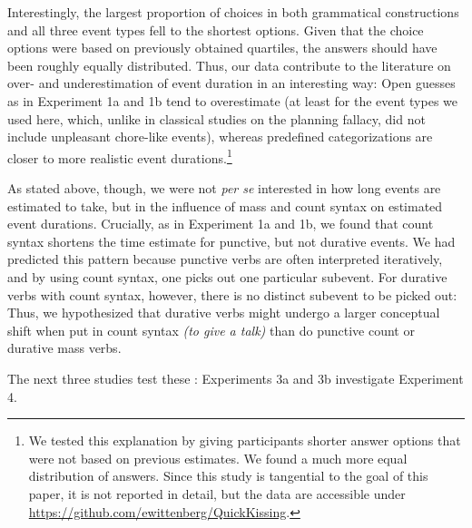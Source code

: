\documentclass[review,12pt,authoryear]{elsarticle}
\begin{document}
Interestingly, the largest proportion of choices in both grammatical constructions and all three event types fell to the shortest options. Given that the choice options were based on previously obtained quartiles, the answers should have been roughly equally distributed. Thus, our data contribute to the literature on over- and underestimation of event duration in an interesting way: Open guesses as in Experiment 1a and 1b tend to overestimate (at least for the event types we used here, which, unlike in classical studies on the planning fallacy, did not include unpleasant chore-like events), whereas predefined categorizations are closer to more realistic event durations.\footnote{We tested this explanation by giving participants shorter answer options that were not based on previous estimates. We found a much more equal distribution of answers. Since this study is tangential to the goal of this paper, it is not reported in detail, but the data are accessible under \url{https://github.com/ewittenberg/QuickKissing}.} 

As stated above, though, we were not \emph{per se} interested in how long events are estimated to take, but in the influence of mass and count syntax on estimated event durations. Crucially, as in Experiment 1a and 1b, we found that count syntax shortens the time estimate for punctive, but not durative events. We had predicted this pattern because punctive verbs are often interpreted iteratively, and by using count syntax, one picks out one particular subevent. For durative verbs with count syntax, however, there is no distinct subevent to be picked out: Thus, we hypothesized that durative verbs might undergo a larger conceptual shift  when put in count syntax \emph{(to give a talk)} than do punctive count or durative mass verbs.

The next three studies test these : Experiments 3a and 3b investigate  Experiment 4. 
\end{document}
